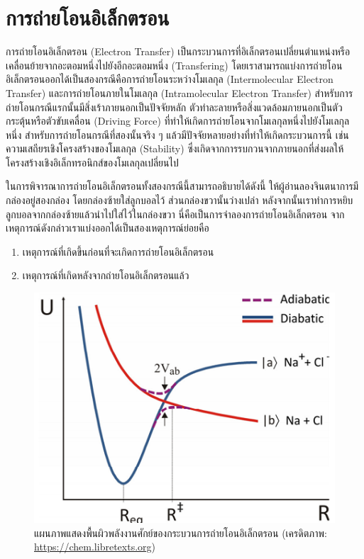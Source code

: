 \section{การถ่ายโอนอิเล็กตรอน}
\label{sec:et}

การถ่ายโอนอิเล็กตรอน (Electron Transfer) เป็นกระบวนการที่อิเล็กตรอนเปลี่ยนตำแหน่งหรือเคลื่อนย้ายจากอะตอมหนึ่งไปยังอีกอะตอมหนึ่ง 
(Transfering) โดยเราสามารถแบ่งการถ่ายโอนอิเล็กตรอนออกได้เป็นสองกรณีคือการถ่ายโอนระหว่างโมเลกุล (Intermolecular Electron 
Transfer) และการถ่ายโอนภายในโมเลกุล (Intramolecular Electron Transfer) สำหรับการถ่ายโอนกรณีแรกนั้นมีสิ่งเร้าภายนอกเป็นปัจจัยหลัก 
ตัวทำละลายหรือสิ่งแวดล้อมภายนอกเป็นตัวกระตุ้นหรือตัวขับเคลื่อน (Driving Force) ที่ทำให้เกิดการถ่ายโอนจากโมเลกุลหนึ่งไปยังโมเลกุลหนึ่ง
สำหรับการถ่ายโอนกรณีที่สองนั้นจริง ๆ แล้วมีปัจจัยหลายอย่างที่ทำให้เกิดกระบวนการนี้ เช่น ความเสถียรเชิงโครงสร้างของโมเลกุล (Stability) 
ซึ่งเกิดจากการรบกวนจากภายนอกที่ส่งผลให้โครงสร้างเชิงอิเล็กทรอนิกส์ของโมเลกุลเปลี่ยนไป 

ในการพิจารณาการถ่ายโอนอิเล็กตรอนทั้งสองกรณีนี้สามารถอธิบายได้ดังนี้ ให้ผู้อ่านลองจินตนาการมีกล่องอยู่สองกล่อง โดยกล่องซ้ายใส่ลูกบอลไว้ 
ส่วนกล่องขวานั้นว่างเปล่า หลังจากนั้นเราทำการหยิบลูกบอลจากกล่องซ้ายแล้วนำไปใส่ไว้ในกล่องขวา นี่คือเป็นการจำลองการถ่ายโอนอิเล็กตรอน 
จากเหตุการณ์ดังกล่าวเราแบ่งออกได้เป็นสองเหตุการณ์ย่อยคือ

\begin{enumerate}
    \item เหตุการณ์ที่เกิดขึ้นก่อนที่จะเกิดการถ่ายโอนอิเล็กตรอน
    
    \item เหตุการณ์ที่เกิดหลังจากถ่ายโอนอิเล็กตรอนแล้ว
\end{enumerate}

\begin{figure}[htbp]
    \centering
    \includegraphics[width=0.7\linewidth]{fig/et_diagram.png}
    \caption{แผนภาพแสดงพื้นผิวพลังงานศักย์ของกระบวนการถ่ายโอนอิเล็กตรอน (เครดิตภาพ: \url{https://chem.libretexts.org})}
    \label{fig:et_diagram}
\end{figure}

